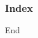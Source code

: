 \documentclass[10pt]{beamer}
\begin{document}



\begin{frame}
\frametitle{Index}
\printindex
\end{frame}

\begin{frame}

\Huge{\centerline{End}}
\end{frame}
\end{document}

